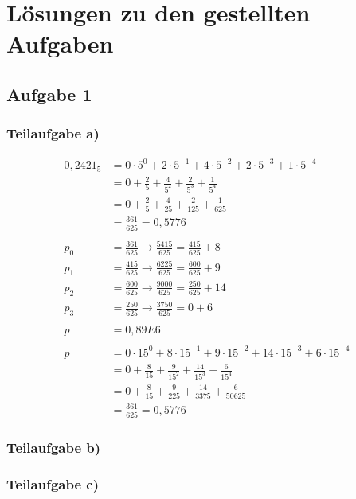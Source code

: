 \documentclass{llncs}
\begin{document}
\chapter*{L\"osungen zu den gestellten Aufgaben}

\section*{Aufgabe 1}

\subsection*{Teilaufgabe a)}

\begin{align*}
0,2421_5 &= 0 \cdot 5^0 + 2 \cdot 5^{-1} + 4 \cdot 5^{-2} + 2 \cdot 5^{-3} + 1 \cdot 5^{-4} \\
         &= 0 + \frac{2}{5} + \frac{4}{5^2} + \frac{2}{5^3} + \frac{1}{5^4} \\
         &= 0 + \frac{2}{5} + \frac{4}{25} + \frac{2}{125} + \frac{1}{625} \\
         &= \frac{361}{625} = 0,5776 \\
\\
p_0 &= \frac{361}{625} \longrightarrow \frac{5415}{625} = \frac{415}{625} + 8\\
p_1 &= \frac{415}{625} \longrightarrow \frac{6225}{625} = \frac{600}{625} + 9\\
p_2 &= \frac{600}{625} \longrightarrow \frac{9000}{625} = \frac{250}{625} + 14\\
p_3 &= \frac{250}{625} \longrightarrow \frac{3750}{625} = 0 + 6\\
\\
   p &= 0,89E6\\
   \\
   p &= 0 \cdot 15^0 + 8 \cdot 15^{-1} + 9 \cdot 15^{-2} + 14 \cdot 15^{-3} + 6 \cdot 15^{-4} \\
     &= 0 + \frac{8}{15} + \frac{9}{15^2} + \frac{14}{15^3} + \frac{6}{15^4} \\
     &= 0 + \frac{8}{15} + \frac{9}{225} + \frac{14}{3375} + \frac{6}{50625} \\
     &= \frac{361}{625} = 0,5776
\end{align*}
\newpage

\subsection*{Teilaufgabe b)}
\subsection*{Teilaufgabe c)}
\end{document}
